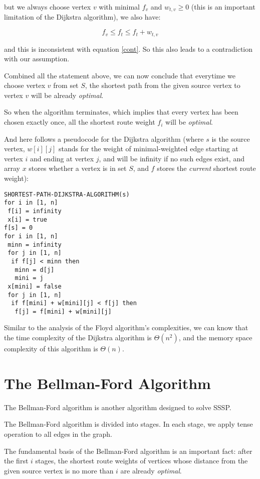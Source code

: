 \documentclass[a4paper,11pt,twocolumn]{article}
\begin{document}
but we always choose vertex $v$ with minimal $f_v$ and $w_{t,v}\ge 0$ (this is an important limitation of the Dijkstra algorithm), we also have:

$$f_v\le f_t\le f_t+w_{t,v}$$

and this is inconsistent with equation \ref{cont}. So this also leads to a contradiction with our assumption.

Combined all the statement above, we can now conclude that everytime we choose vertex $v$ from set $S$, the shortest path from the given source vertex to vertex $v$ will be already \emph{optimal}.

So when the algorithm terminates, which implies that every vertex has been chosen exactly once, all the shortest route weight $f_i$ will be \emph{optimal}.

And here follows a pseudocode for the Dijkstra algorithm (where $s$ is the source vertex, $w[i][j]$ stands for the weight of minimal-weighted edge starting at vertex $i$ and ending at vertex $j$, and will be infinity if no such edges exist, and array $x$ stores whether a vertex is in set $S$, and $f$ stores the \emph{current} shortest route weight):

\begin{verbatim}
SHORTEST-PATH-DIJKSTRA-ALGORITHM(s)
for i in [1, n]
 f[i] = infinity
 x[i] = true
f[s] = 0
for i in [1, n]
 minn = infinity
 for j in [1, n]
  if f[j] < minn then
   minn = d[j]
   mini = j
 x[mini] = false
 for j in [1, n]
  if f[mini] + w[mini][j] < f[j] then
   f[j] = f[mini] + w[mini][j]
\end{verbatim}

Similar to the analysis of the Floyd algorithm's complexities, we can know that the time complexity of the Dijkstra algorithm is $\Theta(n^2)$, and the memory space complexity of this algorithm is $\Theta(n)$.

\section{The Bellman-Ford Algorithm}

The Bellman-Ford algorithm is another algorithm designed to solve SSSP.

The Bellman-Ford algorithm is divided into stages. In each stage, we apply tense operation to all edges in the graph.

The fundamental basis of the Bellman-Ford algorithm is an important fact: after the first $i$ stages, the shortest route weights of vertices whose distance from the given source vertex is no more than $i$ are already \emph{optimal}.
\end{document}
